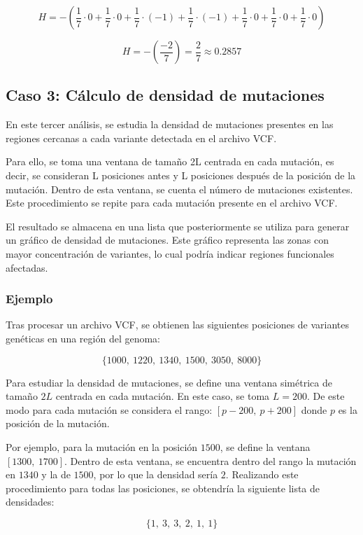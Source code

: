 \documentclass[11pt,spanish,listoffigures,listoftables]{tfgetsinf}
\begin{document}
\[
H = - \left(
\frac{1}{7} \cdot 0 +
\frac{1}{7} \cdot 0 +
\frac{1}{7} \cdot (-1) +
\frac{1}{7} \cdot (-1) +
\frac{1}{7} \cdot 0 +
\frac{1}{7} \cdot 0 +
\frac{1}{7} \cdot 0
\right)
\]

\[
H = - \left( \frac{-2}{7} \right) = \frac{2}{7} \approx 0.2857
\]


\subsection{Caso 3: Cálculo de densidad de mutaciones}

En este tercer análisis, se estudia la densidad de mutaciones presentes en las regiones cercanas a cada variante detectada en el archivo \acs{VCF}.

Para ello, se toma una ventana de tamaño 2L centrada en cada mutación, es decir, se consideran L posiciones antes y L posiciones después de la posición de la mutación. Dentro de esta ventana, se cuenta el número de mutaciones existentes. Este procedimiento se repite para cada mutación presente en el archivo \acs{VCF}.

El resultado se almacena en una lista que posteriormente se utiliza para generar un gráfico de densidad de mutaciones. Este gráfico representa las zonas con mayor concentración de variantes, lo cual podría indicar regiones funcionales afectadas.

\subsubsection{Ejemplo}

Tras procesar un archivo \acs{VCF}, se obtienen las siguientes posiciones de variantes genéticas en una región del genoma:

\[
\{1000,\ 1220,\ 1340,\ 1500,\ 3050,\ 8000\}
\]

Para estudiar la densidad de mutaciones, se define una ventana simétrica de tamaño $2L$ centrada en cada mutación. En este caso, se toma $L = 200$. De este modo para cada mutación se considera el rango: $[p - 200,\ p + 200]$  donde $p$ es la posición de la mutación.

Por ejemplo, para la mutación en la posición $1500$, se define la ventana $[1300,\ 1700]$. Dentro de esta ventana, se encuentra dentro del rango la mutación en $1340$ y la de $1500$, por lo que la densidad sería $2$. Realizando este procedimiento para todas las posiciones, se obtendría la siguiente lista de densidades:

\[
\{1,\ 3,\ 3,\ 2,\ 1,\ 1\}
\]
\end{document}
